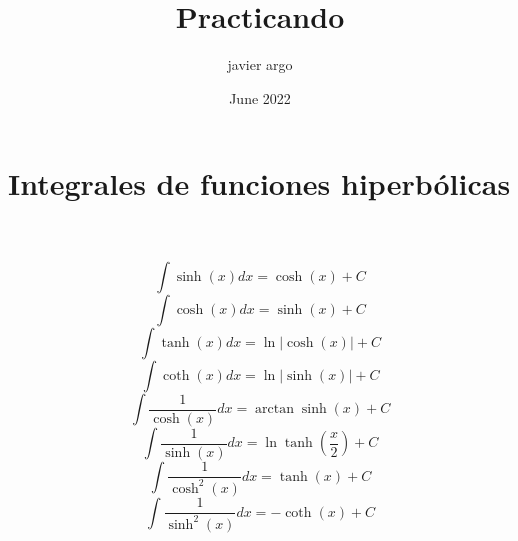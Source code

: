 \documentclass{article}
\title{Practicando}
\author{javier argo}
\date{June 2022}
\providecommand{\abs}[1]{\lvert#1\rvert}
\begin{document}
\tableofcontents
\listoffigures
\maketitle
\section{Integrales de funciones hiperbólicas}
\begin{multicols}{2}
\\ \\
\[ \int \sinh(x) dx = \cosh(x) + C \]
\[ \int \cosh(x) dx = \sinh(x) + C \]
\[ \int \tanh(x) dx = \ln \abs{\cosh(x)} + C \]
\[ \int \coth(x) dx = \ln \abs{\sinh(x)} + C \]
\[ \int \frac{1}{\cosh(x)} dx = \arctan\sinh(x) + C \]
\[ \int \frac{1}{\sinh(x)} dx = \ln \tanh(\frac{x}{2}) + C \]
\[ \int \frac{1}{\cosh^{2}(x)} dx = \tanh(x) + C \]
\[ \int \frac{1}{\sinh^{2}(x)} dx = -\coth(x) + C \]
\end{multicols}
\end{document}
